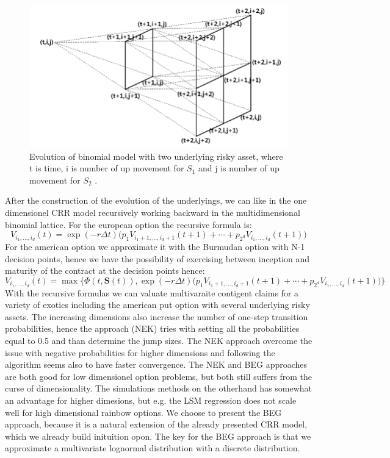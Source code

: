 \begin{figure}[th]
\centering
\includegraphics[width=\textwidth]{Figures/Three-dimensional-binomial-lattice.png}
\decoRule
\caption[Three Dimensionel Binomial Lattice]{Evolution of binomial model with two underlying risky asset, where t is time, i is number of up movement for $S_1$ and j is number of up movement for $S_2$  \parencite{Kim02}.}
\label{fig:threeDimLattice}
\end{figure}

After the construction of the evolution of the underlyings, we can like in the one dimensionel CRR model recursively working backward in the multidimensional binomial lattice. For the european option the recursive formula is:
$$V_{i_1,\ldots, i_d}(t)=\exp(-r\Delta t) \bigg(p_1 V_{i_1+1,\ldots, i_d +1}(t+1) + \cdots + p_{2^d} V_{i_1,\ldots, i_d}(t+1) \bigg)$$
For the american option we approximate it with the Burmudan option with N-1 decision points, hence we have the possibility of exercising between inception and maturity of the contract at the decision points hence:
$$V_{i_1,\ldots, i_d}(t)=\max\{\Phi(t,\bm{S}(t)), \exp(-r\Delta t) \bigg(p_1 V_{i_1+1,\ldots, i_d +1}(t+1) + \cdots + p_{2^d} V_{i_1,\ldots, i_d}(t+1) \bigg)\}$$
With the recursive formulas we can valuate multivaraite contigent claims for a variety of exotics including the american put option with several underlying risky assets. The increasing dimensions also increase the number of one-step transition probabilities, hence the \parencite{NEK} approach (NEK) tries with setting all the probabilities equal to 0.5 and than determine the jump sizes. The NEK approach overcome the issue with negative probabilities for higher dimensions and following \parencite{NEK} the algorithm seems also to have faster convergence. The NEK and BEG approaches are both good for low dimensionel option problems, but both still suffers from the curse of dimensionality. The simulations methods on the otherhand has somewhat an advantage for higher dimesions, but e.g. the LSM regression does not scale well for high dimensional rainbow options. We choose to present the BEG approach, because it is a natural extension of the already presented CRR model, which we already build inituition opon. The key for the BEG approach is that we approximate a multivariate lognormal distribution with a discrete distribution. 

